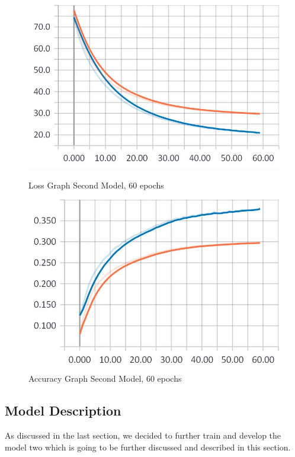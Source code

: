 \begin{figure}[htp]
\centering
\begin{minipage}{.5\textwidth}
	\centering
	\captionsetup{justification=centering,margin=2cm}
	\includegraphics[width=1\linewidth]{Illustrations/losss5.jpg}
	\caption{Loss Graph Second Model, 60 epochs}
	\label{fig:loss5}
\end{minipage}%
\begin{minipage}{.5\textwidth}
	\centering
	\captionsetup{justification=centering,margin=2cm}
	\includegraphics[width=1\linewidth]{Illustrations/accuracy5.jpg}
	\caption{Accuracy Graph Second Model, 60 epochs}
	\label{fig:accuracy5}
\end{minipage}
\end{figure}

\newpage
\subsection{Model Description}
As discussed in the last section, we decided to further train and develop the model two which is going to be further discussed and described in this section.

